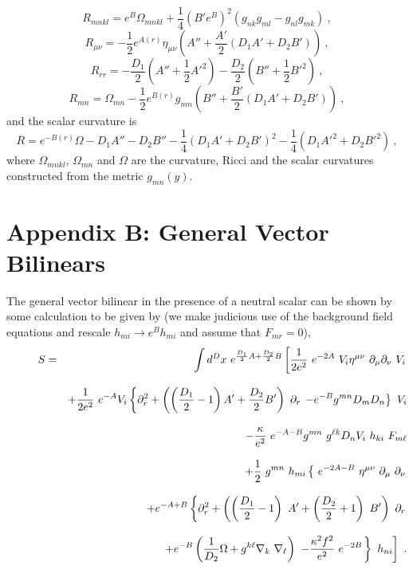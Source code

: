 \documentclass[a4paper,12pt]{article}
\begin{document}
\begin{appendix}
\begin{equation}
R_{mnkl}=e^B\Omega_{mnkl} +\frac{1}{4}\left(B'e^B\right)^2
\left(g_{nk}g_{ml}-g_{nl}g_{mk}\right)~,
\end{equation}
\begin{equation}
R_{\mu\nu}= -\frac{1}{2}e^{A(r)}\eta_{\mu\nu}\left(A''
+\frac{A'}{2}(D_1 A' + D_2 B')\right)~,
\end{equation}
\begin{equation}
R_{rr}=-\frac{D_1}{2}\left(A''+\frac{1}{2}{A'}^2 \right) -
\frac{D_2}{2}\left(B''+\frac{1}{2}{B'}^2 \right)~,
\end{equation}
\begin{equation}
R_{mn}= \Omega_{mn} - \frac{1}{2}e^{B(r)}g_{mn}\left(B''
+\frac{B'}{2}(D_1 A' + D_2 B')\right)~,
\end{equation}
and the scalar curvature is
\begin{equation}
R=e^{-B(r)}\Omega - D_1 A'' -D_2 B'' -\frac{1}{4}(D_1 A' + D_2 B')^2
-\frac{1}{4}(D_1 {A'}^2 + D_2 {B'}^2)~,
\end{equation}
where $\Omega_{mnkl}$, $\Omega_{mn}$ and $\Omega$ are the curvature,
Ricci and the scalar curvatures constructed from the metric
$g_{mn}(y)$.

\newpage
\renewcommand{\theequation}{B.\arabic{equation}}
\setcounter{equation}{0}


\section*{Appendix B: General Vector Bilinears}

The general vector bilinear in the presence of a neutral scalar can
be shown by some calculation  to be given by (we make judicious use
of the background field equations and rescale $h_{mi}\rightarrow e^B
h_{mi}$ and  assume that $F_{mr}=0$),
\begin{eqnarray*}
\null\hspace{1cm}S = &&\int d^Dx\ e^{\frac{D_1}{2} A + \frac{D_2}{2}
B}  \left[\frac{1}{2e^2}\ e^{-2A}\ V_i \eta^{\mu\nu}\
\partial_\mu\partial_\nu\ V_i\right.
\\[3mm]
&&+\frac{1}{2e^2} \ e^{-A} V_i\left\{ \partial^2_r +
\left(\left(\frac{D_1}{2} -1\right) A'+\frac{D_2}{2}B'\right)\
\partial_r\right. \left. -e^{-B}g^{mn}D_mD_n\right\}\ V_i
\\[3mm]
&&-\frac{\kappa}{e^2} \ e^{-A-B} g^{mn}\ g^{\ell k} D_n V_i \ h_{ki}\
F_{m\ell}
\\[3mm]
&&+\frac{1}{2} \ g^{mn}\ h_{mi}\left\{ \ e^{-2A-B}\ \eta^{\mu\nu}\
\partial_\mu\ \partial_\nu\right.
\\[3mm]
&&+e^{-A+B}\left\{\partial^2_r + \left(\left(\frac{D_1}{2}-1\right)\
A' +\left(\frac{D_2}{2}+1\right)\ B'\right)\ \partial_r\right.
\\[3mm]
&&+e^{-B}\left(\frac{1}{D_2}\Omega +g^{k\ell}\nabla_k\
\nabla_\ell\right) \left. \left.\left. -\frac{\kappa^2 f^2}{e^2}\
e^{-2B}\right.\right\}\ h_{ni}\right]~.
\end{eqnarray*}


\end{appendix}
\end{document}
